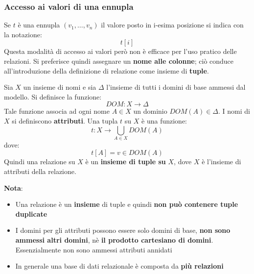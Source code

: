 \documentclass[a4paper,twoside]{article}
\begin{document}
\subsubsection{Accesso ai valori di una ennupla}
Se \( t \) è una ennupla \( \left( v_1, \ldots, v_n \right)  \) il valore posto in i-esima
posizione si indica con la notazione:
\[
  t[i]
\] 
Questa modalità di accesso ai valori però non è efficace per l'uso pratico delle relazioni.
Si preferisce quindi assegnare un \textbf{nome alle colonne}; ciò conduce all'introduzione
della definizione di relazione come insieme di \textbf{tuple}.

\begin{definition}
  Sia \( X \) un insieme di nomi e sia \( \Delta \) l'insieme di tutti i domini di base
  ammessi dal modello. Si definisce la funzione:
  \[
    DOM: X \to \Delta
  \] 
  Tale funzione associa ad ogni nome \( A \in X \) un dominio \( DOM(A) \in \Delta \).
  I nomi di \( X \) si definiscono \textbf{attributi}.
  Una tupla \( t \) su \( X \) è una funzione:
  \[
    t: X \to \bigcup_{A \in X} DOM(A)
  \] 
  dove:
  \[
    t[A] = v \in DOM(A)
  \] 
  Quindi una relazione su \( X \) è un \textbf{insieme di tuple su } \( X \), dove
  \( X \) è l'insieme di attributi della relazione.

  \vspace{1em}
  \noindent
  \textbf{Nota}:
  \begin{itemize}
    \item Una relazione è un \textbf{insieme} di tuple e quindi \textbf{non può contenere
      tuple duplicate}
    \item I domini per gli attributi possono essere solo domini di base, \textbf{non sono
      ammessi altri domini}, nè \textbf{il prodotto cartesiano di domini}. Essenzialmente
      non sono ammessi attributi annidati
    \item In generale una base di dati relazionale è composta da \textbf{più relazioni}
  \end{itemize}
\end{definition}
\end{document}
